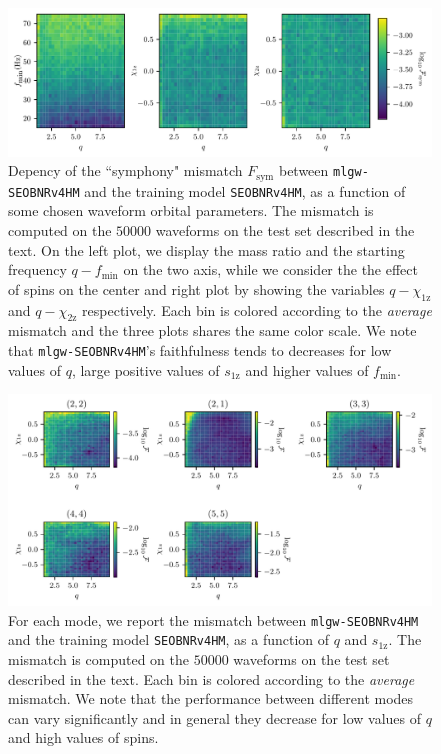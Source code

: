 \documentclass[twocolumn,showpacs,preprintnumbers,nofootinbib,prd,
superscriptaddress,10pt]{revtex4-2}
\begin{document}
\begin{figure}[t]
	\centering
	\includegraphics[width=\textwidth]{colormesh}
	\caption{
	Depency of the ``symphony" mismatch $F_\text{sym}$ between \texttt{mlgw-SEOBNRv4HM} and the training model \texttt{SEOBNRv4HM}, as a function of some chosen waveform orbital parameters. The mismatch is computed on the $50000$ waveforms on the test set described in the text.
	On the left plot, we display the mass ratio and the starting frequency $q-f_\text{min}$ on the two axis, while we consider the the effect of spins on the center and right plot by showing the variables $q-\chi_\text{1z}$ and $q-\chi_\text{2z}$ respectively. 
	Each bin is colored according to the \textit{average} mismatch and the three plots shares the same color scale.
	We note that \texttt{mlgw-SEOBNRv4HM}'s faithfulness tends to decreases for low values of $q$, large positive values of $s_\text{1z}$ and higher values of $f_\text{min}$.
	}
	\label{fig:countour_plots}
\end{figure}

\begin{figure}[t]
	\centering
	\includegraphics[width=\textwidth]{colormesh_modes}
	\caption{
	For each mode, we report the mismatch between \texttt{mlgw-SEOBNRv4HM} and the training model \texttt{SEOBNRv4HM}, as a function of $q$ and $s_\text{1z}$. The mismatch is computed on the $50000$ waveforms on the test set described in the text.
	Each bin is colored according to the \textit{average} mismatch.
	We note that the performance between different modes can vary significantly and in general they decrease for low values of $q$ and high values of spins.
	}
	\label{fig:countour_plots_modes}
\end{figure}
\end{document}
